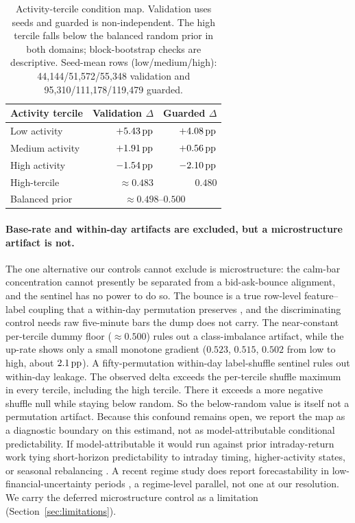 \begin{table}[t]
  \centering
  \caption{Activity-tercile condition map. Validation uses \numseeds{} seeds
  and guarded is non-independent. The high tercile falls below the
  balanced random prior in both domains; block-bootstrap checks are descriptive.
  Seed-mean rows (low/medium/high): 44{,}144/51{,}572/55{,}348 validation and
  95{,}310/111{,}178/119{,}479 guarded.}
  \label{tab:tercile}
  \begin{tabular}{lrr}
    \toprule
    Activity tercile & Validation $\Delta$ & Guarded $\Delta$ \\
    \midrule
    Low activity    & $+5.43\,\textrm{pp}$ & $+4.08\,\textrm{pp}$ \\
    Medium activity & $+1.91\,\textrm{pp}$ & $+0.56\,\textrm{pp}$ \\
    High activity   & $-1.54\,\textrm{pp}$ & $-2.10\,\textrm{pp}$ \\
    \midrule
    High-tercile \macrofone{} & $\approx 0.483$ & $0.480$ \\
    Balanced prior & \multicolumn{2}{c}{$\approx 0.498$--$0.500$} \\
    \bottomrule
  \end{tabular}
\end{table}

\paragraph{Base-rate and within-day artifacts are excluded, but a microstructure artifact is not.}
The one alternative our controls cannot exclude is microstructure: the calm-bar
concentration cannot presently be separated from a bid-ask-bounce alignment, and
the sentinel has no power to do so. The bounce is a true row-level feature--label
coupling that a within-day permutation preserves
\cite{roll1984simple,lo1990nonsynchronous}, and the discriminating control needs
raw five-minute bars the dump does not carry. The near-constant per-tercile dummy
floor ($\approx 0.500$) rules out a class-imbalance artifact, while the up-rate
shows only a small monotone gradient ($0.523$, $0.515$, $0.502$ from low to high,
about $2.1\,\textrm{pp}$). A fifty-permutation within-day label-shuffle sentinel rules out
within-day leakage. The observed delta exceeds the per-tercile shuffle maximum in
every tercile, including the high tercile. There it exceeds a more negative
shuffle null while staying below random. So the below-random value is itself not a
permutation artifact. Because this confound remains open, we report
the map as a diagnostic boundary on this estimand, not as model-attributable
conditional predictability. If model-attributable it would run against prior
intraday-return work tying short-horizon predictability to intraday timing,
higher-activity states, or seasonal rebalancing
\cite{heston2010intraday,henkel2011timevarying,bogousslavsky2016infrequent}.
A recent regime study does report forecastability in low-financial-uncertainty
periods \cite{ferrer2023forecast}, a regime-level parallel, not one at our
resolution. We carry the deferred microstructure control as a limitation
(Section~\ref{sec:limitations}).

